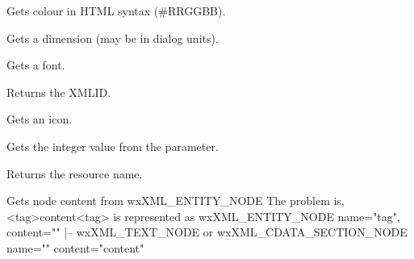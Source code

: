 \label{wxxmlresourcehandlergetcolour}


Gets colour in HTML syntax (\#RRGGBB).


\label{wxxmlresourcehandlergetcurfilesystem}



\label{wxxmlresourcehandlergetdimension}


Gets a dimension (may be in dialog units).


\label{wxxmlresourcehandlergetfont}


Gets a font.


\label{wxxmlresourcehandlergetid}


Returns the XMLID.


\label{wxxmlresourcehandlergeticon}


Gets an icon.


\label{wxxmlresourcehandlergetlong}


Gets the integer value from the parameter.


\label{wxxmlresourcehandlergetname}


Returns the resource name.


\label{wxxmlresourcehandlergetnodecontent}


Gets node content from wxXML\_ENTITY\_NODE
The problem is, <tag>content<tag> is represented as
wxXML\_ENTITY\_NODE name="tag", content=""
|-- wxXML\_TEXT\_NODE or
wxXML\_CDATA\_SECTION\_NODE name="" content="content"


